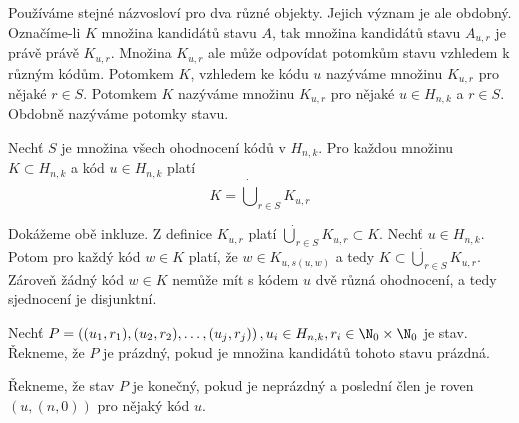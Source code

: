 \begin{pozn}\label{poznvztahmezipotomkystavuamnoziny}
    Používáme stejné názvosloví pro dva různé objekty. Jejich význam je ale obdobný. Označíme-li $K$ množina kandidátů stavu $A$, tak množina kandidátů stavu $A_{u,r}$ je právě právě $K_{u,r}$. Množina $K_{u,r}$ ale může odpovídat potomkům stavu vzhledem k různým kódům. 
    Potomkem $K$, vzhledem ke kódu $u$ nazýváme množinu $K_{u,r}$ pro nějaké $r \in S$. Potomkem $K$ nazýváme množinu $K_{u,r}$ pro nějaké $u\in H_{n,k}$ a $r \in S$. Obdobně nazýváme potomky stavu. 
\end{pozn}

\begin{lemma}
    Nechť $S$ je množina všech ohodnocení kódů v $H_{n,k}$. Pro každou množinu $K \subset H_{n,k}$ a kód $u \in H_{n,k}$ platí
    \[K = \dot\bigcup_{r\in S} K_{u,r}\]
\end{lemma}
\begin{dukaz}
    Dokážeme obě inkluze. Z definice $K_{u,r}$ platí $\dot\bigcup_{r\in S} K_{u,r} \subset K$. Nechť $u \in H_{n,k}$. Potom pro každý kód $w \in K$ platí, že $w \in K_{u, s(u,w)}$ a tedy $K \subset \dot\bigcup_{r\in S} K_{u,r}$. Zároveň žádný kód $w \in K$ nemůže mít s kódem $u$ dvě různá ohodnocení, a tedy sjednocení je disjunktní. 
\end{dukaz}





\begin{definice}\label{kandidat}
  Nechť $P = \left((u_1, r_1), (u_2,r_2), \dots, (u_j,r_j)\right), u_i \in H_{n,k}, r_i \in \N _0 \times \N _0$ je stav. Řekneme, že $P$ je prázdný, pokud je množina kandidátů tohoto stavu prázdná. 

  Řekneme, že stav $P$ je konečný, pokud je neprázdný a poslední člen je roven $(u,(n,0))$ pro nějaký kód $u$.
\end{definice}

